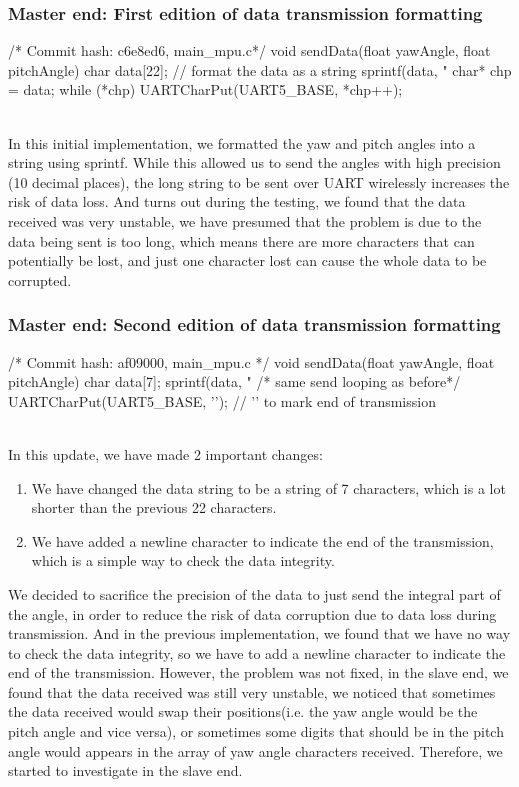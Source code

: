 \documentclass[12pt, a4paper]{article}
\begin{document}
\subsubsection{Master end: First edition of data transmission formatting}\text{}
\begin{code}
/* Commit hash: c6e8ed6, main_mpu.c*/
void sendData(float yawAngle, float pitchAngle) {
    char data[22];
    // format the data as a string
    sprintf(data, "%
    char* chp = data;
    while (*chp) 
        UARTCharPut(UART5_BASE, *chp++);
}
\end{code}\text{}\\
In this initial implementation, we formatted the yaw and pitch angles into a string using sprintf. 
While this allowed us to send the angles with high precision (10 decimal places), 
the long string to be sent over UART wirelessly increases the risk of data loss. And turns out during the testing, 
we found that the data received was very unstable, we have presumed that the problem is due to the data being sent is too long, 
which means there are more characters that can potentially be lost, and just one character lost can cause the whole data to be corrupted.

\subsubsection{Master end: Second edition of data transmission formatting}\text{}
\begin{code}
/* Commit hash: af09000, main_mpu.c */
void sendData(float yawAngle, float pitchAngle) {
    char data[7]; 
    sprintf(data, "%
    /* same send looping as before*/
    UARTCharPut(UART5_BASE, '\n'); // '\n' to mark end of transmission
}
\end{code}
\textbf{}\\
In this update, we have made 2 important changes:
\begin{enumerate}
    \item We have changed the data string to be a string of 7 characters, which is a lot shorter than the previous 22 characters.
    \item We have added a newline character to indicate the end of the transmission, which is a simple way to check the data integrity.
\end{enumerate}
We decided to sacrifice the precision of the data to just send the integral part of the angle, 
in order to reduce the risk of data corruption due to data loss during transmission. 
And in the previous implementation, we found that we have no way to check the data integrity, 
so we have to add a newline character to indicate the end of the transmission.
However, the problem was not fixed, in the slave end, we found that the data received was still very unstable, 
we noticed that sometimes the data received would swap their positions(i.e. the yaw angle would be the pitch angle and vice versa), 
or sometimes some digits that should be in the pitch angle would appears in the array of yaw angle characters received.
Therefore, we started to investigate in the slave end.
\end{document}
